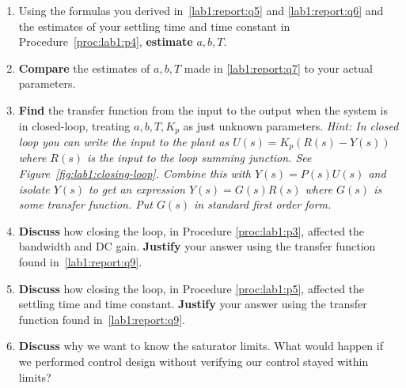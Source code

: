 \begin{deliverable}[label={lab1:report}]
\begin{enumerate}[label={(\arabic*)}]
{      \label{lab1:report:q6}
    }
    \item{
      Using the formulas you derived in~\ref{lab1:report:q5} and
      \ref{lab1:report:q6} and the estimates of your settling time and
      time constant in Procedure~\ref{proc:lab1:p4},
      \textbf{estimate} \(a, b, T.\)
      \label{lab1:report:q7}
    }
    \item{
      \textbf{Compare} the estimates of \(a, b, T\) made in
      \ref{lab1:report:q7} to your actual parameters.
      \label{lab1:report:q8}
    }
    \item{
      \textbf{Find} the transfer
      function from the input to the output when the system is in
      closed-loop, treating \(a, b, T, K_p\) as just unknown parameters.
      \emph{Hint: In closed loop you can write the input to the plant as
      \(U(s) = K_p(R(s) - Y(s))\)
      where \(R(s)\) is the input to the loop summing junction. See
      Figure~\ref{fig:lab1:closing-loop}. Combine this with \(Y(s) = P(s)U(s)\)
      and isolate \(Y(s)\) to get an expression \(Y(s) = G(s) R(s)\) where
      \(G(s)\) is some transfer function. Put \(G(s)\) in standard first order form.}
      \label{lab1:report:q9}
    }
    \item{
      \textbf{Discuss} how closing the loop, in Procedure
      \ref{proc:lab1:p3}, affected the bandwidth and DC gain.
      \textbf{Justify} your answer using the transfer function
      found in~\ref{lab1:report:q9}.
      \label{lab1:report:q10}
    }
    \item{
      \textbf{Discuss} how closing the loop, in Procedure
      \ref{proc:lab1:p5}, affected the settling time and time constant.
      \textbf{Justify} your answer using the transfer function
      found in~\ref{lab1:report:q9}.
      \label{lab1:report:q11}
    }
    \item{
      \textbf{Discuss} why we want to know the saturator limits. What would
      happen if we performed control design without verifying our control
      stayed within limits?
      \label{lab1:report:q12}
    }
  \end{enumerate}
\end{deliverable}

